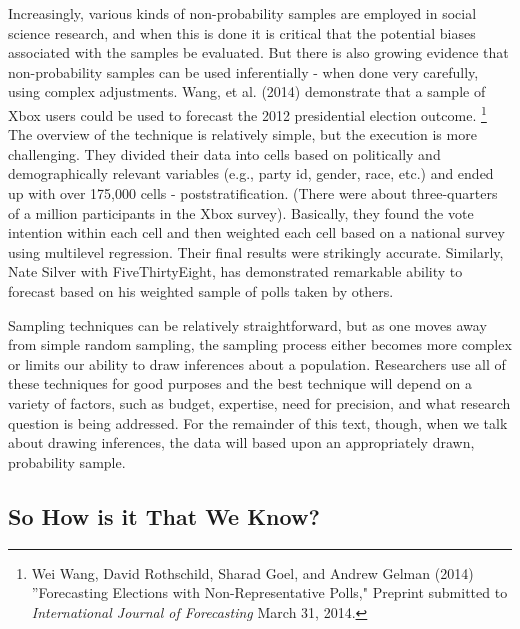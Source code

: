 \documentclass[11pt,openany]{book}\usepackage[]{graphicx}\usepackage[]{color}
\begin{document}
{Increasingly, various kinds of non-probability samples are employed in social science research, and when this is done it is critical that the potential biases associated with the samples be evaluated.  But there is also growing evidence that non-probability samples can be used inferentially - when done very carefully, using complex adjustments.  Wang, et al. (2014) demonstrate that a sample of Xbox users could be used to forecast the 2012 presidential election outcome. \footnote{Wei Wang, David Rothschild, Sharad Goel, and Andrew Gelman (2014)  ''Forecasting Elections with Non-Representative Polls," Preprint submitted to \textit{International Journal of Forecasting} March 31, 2014.}  The overview of the technique is relatively simple, but the execution is more challenging.  They divided their data into cells based on politically and demographically relevant variables (e.g., party id, gender, race, etc.) and ended up with over 175,000 cells - poststratification.  (There were about three-quarters of a million participants in the Xbox survey).  Basically, they found the vote intention within each cell and then weighted each cell based on a national survey using multilevel regression.   Their final results were strikingly accurate.   Similarly, Nate Silver with FiveThirtyEight, has demonstrated remarkable ability to forecast based on his weighted sample of polls taken by others.
  
Sampling techniques can be relatively straightforward, but as one moves away from simple random sampling, the sampling process either becomes more complex or limits our ability to draw inferences about a population.  Researchers use all of these techniques for good purposes and the best technique will depend on a variety of factors, such as budget, expertise, need for precision, and what research question is being addressed. For the remainder of this text, though, when we talk about drawing inferences, the data will based upon an appropriately drawn, probability sample.

\subsection{So How is it That We Know?} 

}
\end{document}
